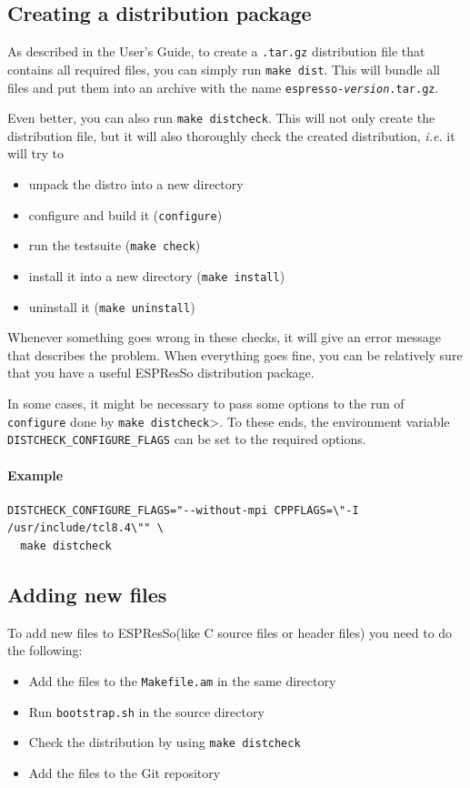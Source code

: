 \documentclass[
a4paper,                        %
11pt,                           %
twoside,                        %
footsepline,                    %
headsepline,                    %
headexclude,                    %
footexclude,                    %
pagesize,                       %
bibtotocnumbered,               %
idxtotoc                        %
]{scrreprt}
\newcommand{\es}{\mbox{\textsf{ESPResSo}}\xspace}
\newcommand{\ie}{\textit{i.e.}\xspace}
\begin{document}
\subsection{Creating a distribution package}

As described in the User's Guide, to create a \texttt{.tar.gz}
distribution file that contains all required files, you can simply run
\texttt{make dist}. This will bundle all files and put them into an
archive with the name
\texttt{espresso-\textit{version}\texttt{.tar.gz}}.

Even better, you can also run \texttt{make distcheck}. This will not
only create the distribution file, but it will also thoroughly check
the created distribution, \ie it will try to 
\begin{itemize}
\item unpack the distro into a new directory
\item configure and build it (\texttt{configure})
\item run the testsuite (\texttt{make check})
\item install it into a new directory (\texttt{make install})
\item uninstall it (\texttt{make uninstall})
\end{itemize}
Whenever something goes wrong in these checks, it will give an error
message that describes the problem. When everything goes fine, you can
be relatively sure that you have a useful \es distribution
package.

In some cases, it might be necessary to pass some options to the run
of \texttt{configure} done by \texttt{make distcheck}>. To these ends,
the environment variable \texttt{DISTCHECK\_CONFIGURE\_FLAGS} can be
set to the required options.

\paragraph{Example}
\begin{verbatim}
DISTCHECK_CONFIGURE_FLAGS="--without-mpi CPPFLAGS=\"-I /usr/include/tcl8.4\"" \
  make distcheck
\end{verbatim}

\subsection{Adding new files}

To add new files to \es (like C source files or header files)
you need to do the following:
\begin{itemize}
\item Add the files to the \texttt{Makefile.am} in the same directory
\item Run \texttt{bootstrap.sh} in the source directory
\item Check the distribution by using \verb!make distcheck!
\item Add the files to the Git repository
\end{itemize}
\end{document}
